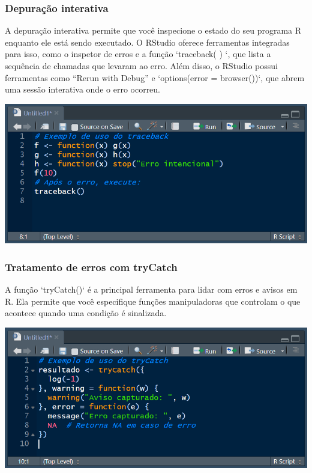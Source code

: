 \documentclass[
]{book}
\begin{document}
\subsubsection{Depuração interativa}\label{depurauxe7uxe3o-interativa}

A depuração interativa permite que você inspecione o estado do seu programa R enquanto ele está sendo executado. O RStudio oferece ferramentas integradas para isso, como o inspetor de erros e a função `traceback( ) `, que lista a sequência de chamadas que levaram ao erro. Além disso, o RStudio possui ferramentas como ``Rerun with Debug'' e `options(error = browser())`, que abrem uma sessão interativa onde o erro ocorreu.

\includegraphics{images/clipboard-3416304030.png}

\subsubsection{Tratamento de erros com tryCatch}\label{tratamento-de-erros-com-trycatch}

A função `tryCatch()` é a principal ferramenta para lidar com erros e avisos em R. Ela permite que você especifique funções manipuladoras que controlam o que acontece quando uma condição é sinalizada.

\includegraphics{images/clipboard-3819030973.png}
\end{document}
